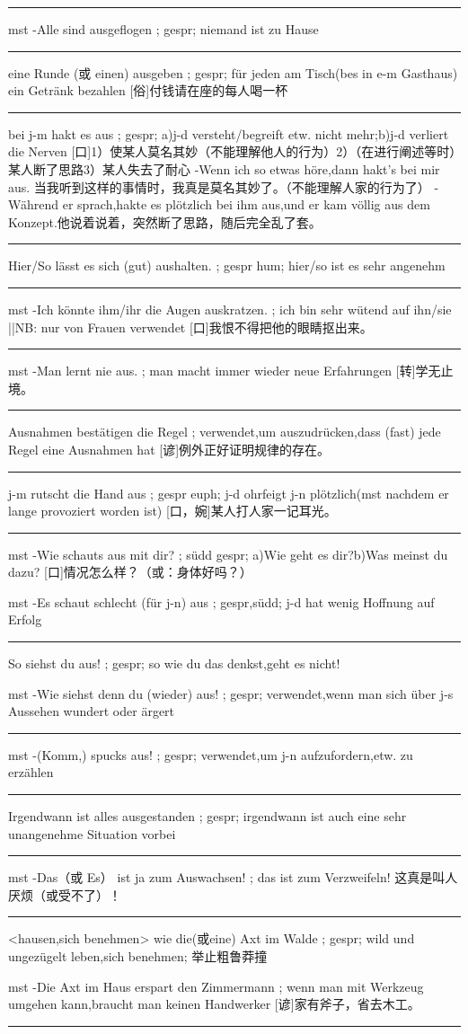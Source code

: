 \noindent\rule{\textwidth}{1pt}  
mst -Alle sind ausgeflogen ; gespr; niemand ist zu Hause

\noindent\rule{\textwidth}{1pt}  
eine Runde (或 einen) ausgeben ; gespr; für jeden am Tisch(bes in e-m Gasthaus) ein Getränk bezahlen
[俗]付钱请在座的每人喝一杯

\noindent\rule{\textwidth}{1pt}  
bei j-m hakt es aus ; gespr; a)j-d versteht/begreift etw. nicht mehr;b)j-d verliert die Nerven
[口]1）使某人莫名其妙（不能理解他人的行为）2）（在进行阐述等时）某人断了思路3）某人失去了耐心
-Wenn ich so etwas höre,dann hakt's bei mir aus. 当我听到这样的事情时，我真是莫名其妙了。（不能理解人家的行为了）
-Während er sprach,hakte es plötzlich bei ihm aus,und er kam völlig aus dem Konzept.他说着说着，突然断了思路，随后完全乱了套。

\noindent\rule{\textwidth}{1pt}  
Hier/So lässt es sich (gut) aushalten. ; gespr hum; hier/so ist es sehr angenehm

\noindent\rule{\textwidth}{1pt}  
mst -Ich könnte ihm/ihr die Augen auskratzen. ; ich bin sehr wütend auf ihn/sie ||NB: nur von Frauen verwendet
[口]我恨不得把他的眼睛抠出来。

\noindent\rule{\textwidth}{1pt}  
mst -Man lernt nie aus. ; man macht immer wieder neue Erfahrungen
[转]学无止境。

\noindent\rule{\textwidth}{1pt}  
Ausnahmen bestätigen die Regel ; verwendet,um auszudrücken,dass (fast) jede Regel eine Ausnahmen hat
[谚]例外正好证明规律的存在。

\noindent\rule{\textwidth}{1pt}  
j-m rutscht die Hand aus ; gespr euph; j-d ohrfeigt j-n plötzlich(mst nachdem er lange provoziert worden ist)
[口，婉]某人打人家一记耳光。

\noindent\rule{\textwidth}{1pt}  
mst -Wie schauts aus mit dir? ; südd gespr; a)Wie geht es dir?b)Was meinst du dazu?
[口]情况怎么样？（或：身体好吗？）

mst -Es schaut schlecht (für j-n) aus ; gespr,südd; j-d hat wenig Hoffnung auf Erfolg

\noindent\rule{\textwidth}{1pt}  
So siehst du aus! ; gespr; so wie du das denkst,geht es nicht!

mst -Wie siehst denn du (wieder) aus! ; gespr; verwendet,wenn man sich über j-s Aussehen wundert oder ärgert

\noindent\rule{\textwidth}{1pt}  
mst -(Komm,) spucks aus! ; gespr; verwendet,um j-n aufzufordern,etw. zu erzählen

\noindent\rule{\textwidth}{1pt}  
Irgendwann ist alles ausgestanden ; gespr; irgendwann ist auch eine sehr unangenehme Situation vorbei

\noindent\rule{\textwidth}{1pt}  
mst -Das（或 Es） ist ja zum Auswachsen! ; das ist zum Verzweifeln!
这真是叫人厌烦（或受不了）！

\noindent\rule{\textwidth}{1pt}  
<hausen,sich benehmen> wie die(或eine) Axt im Walde ; gespr; wild und ungezügelt leben,sich benehmen;
举止粗鲁莽撞

mst -Die Axt im Haus erspart den Zimmermann ; wenn man mit Werkzeug umgehen kann,braucht man keinen Handwerker
[谚]家有斧子，省去木工。

\noindent\rule{\textwidth}{1pt}  

